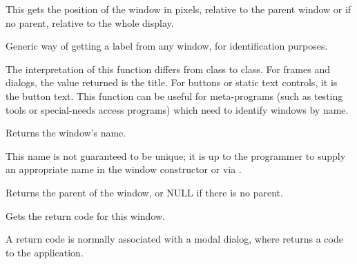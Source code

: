 
This gets the position of the window in pixels, relative to the parent window or
if no parent, relative to the whole display.






Generic way of getting a label from any window, for
identification purposes.


The interpretation of this function differs from class to class.
For frames and dialogs, the value returned is the title. For buttons or static text controls, it is
the button text. This function can be useful for meta-programs (such as testing
tools or special-needs access programs) which need to identify windows
by name.

\label{wxwindowgetname}


Returns the window's name.


This name is not guaranteed to be unique; it is up to the programmer to supply an appropriate
name in the window constructor or via .





Returns the parent of the window, or NULL if there is no parent.

\label{wxwindowgetreturncode}


Gets the return code for this window.


A return code is normally associated with a modal dialog, where  returns
a code to the application.

